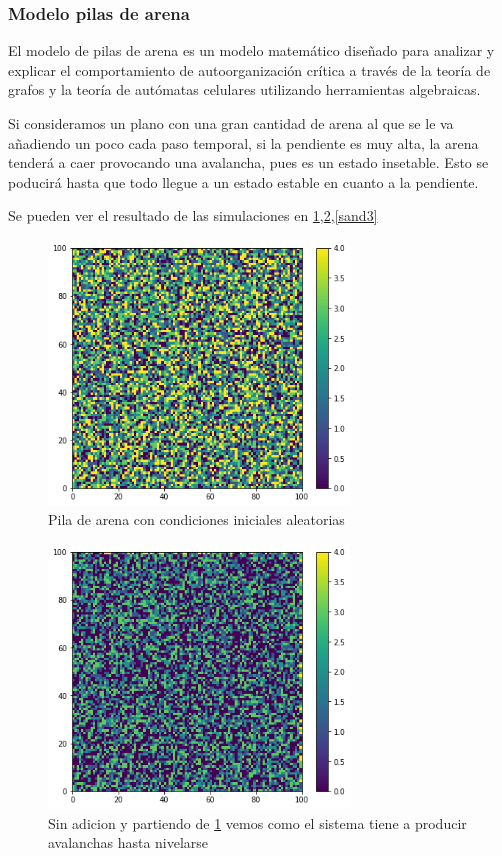 \subsubsection{\large Modelo pilas de arena}     
El modelo de pilas de arena es un modelo matemático diseñado para analizar y explicar el comportamiento de autoorganización crítica a través de la teoría de grafos y la teoría de autómatas celulares utilizando herramientas algebraicas.

Si consideramos un plano con una gran cantidad de arena al que se le va añadiendo un poco cada paso temporal, si la pendiente es muy alta, la arena tenderá a caer provocando una avalancha, pues es un estado insetable. Esto se poducirá hasta que todo llegue a un estado estable en cuanto a la pendiente.

Se pueden ver el resultado de las simulaciones en \ref{sand1},\ref{sand2},\ref{sand3}

 \begin{figure}
 	\centering
 	\includegraphics[width=8cm]{pila_arena_random}
 	\caption{Pila de arena con condiciones iniciales aleatorias  }
 	\label{sand1}
 \end{figure}
  \begin{figure}
  	\centering
  	\includegraphics[width=8cm]{pila_arena_random_2}
  	\caption{Sin adicion y partiendo de \ref{sand1} vemos como el sistema tiene a producir avalanchas hasta nivelarse }
  	\label{sand2}
  \end{figure}

